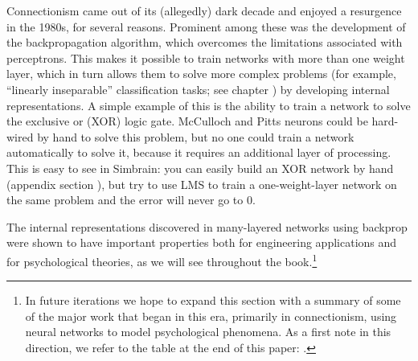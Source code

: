 
Connectionism came out of its (allegedly) dark decade and enjoyed a resurgence in the 1980s, for several reasons. Prominent among these was the development of the backpropagation algorithm, which overcomes the limitations associated with perceptrons. This makes it possible to train networks with more than one weight layer, which in turn allows them to solve more complex problems (for example, ``linearly inseparable'' classification tasks; see chapter ) by developing internal representations. A simple example of this is the ability to train a network to solve the exclusive or (XOR) logic gate. McCulloch and Pitts neurons could be hard-wired by hand to solve this problem, but no one could train a network automatically to solve it, because it requires an additional layer of processing. This is easy to see in Simbrain: you can easily build an XOR network by hand (appendix section ), but try to use LMS to train a one-weight-layer network on the same problem and the error will never go to 0.

The internal representations discovered in many-layered networks using backprop were shown to have important properties both for engineering applications and for psychological theories, as we will see throughout the book.\footnote{In future iterations we hope to expand this section with a summary of some of the major work that began in this era, primarily in connectionism, using neural networks to model psychological phenomena. As a first note in this direction, we refer to the table at the end of this paper: .}



